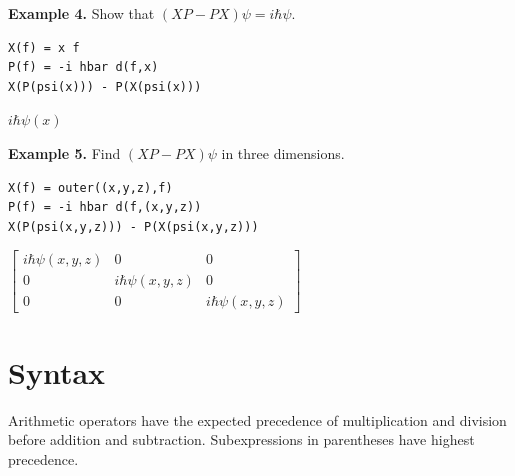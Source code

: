 \documentclass[12pt]{article}
\begin{document}
\bigskip
{\bf Example 4.} Show that $(XP-PX)\psi=i\hbar\psi$.
{\color{blue}
\begin{verbatim}
X(f) = x f
P(f) = -i hbar d(f,x)
X(P(psi(x))) - P(X(psi(x)))
\end{verbatim}}
$i\hbar\psi(x)$

\bigskip
{\bf Example 5.} Find $(XP-PX)\psi$ in three dimensions.
{\color{blue}
\begin{verbatim}
X(f) = outer((x,y,z),f)
P(f) = -i hbar d(f,(x,y,z))
X(P(psi(x,y,z))) - P(X(psi(x,y,z)))
\end{verbatim}}
$\begin{bmatrix}
i\hbar\psi(x,y,z) & 0 & 0
\\[1ex]
0 & i\hbar\psi(x,y,z) & 0
\\[1ex]
0 & 0 & i\hbar\psi(x,y,z)
\end{bmatrix}
$

\newpage

\section{Syntax}

Arithmetic operators have the expected precedence of
multiplication and division before addition and subtraction.
Subexpressions in parentheses have highest precedence.
\end{document}
